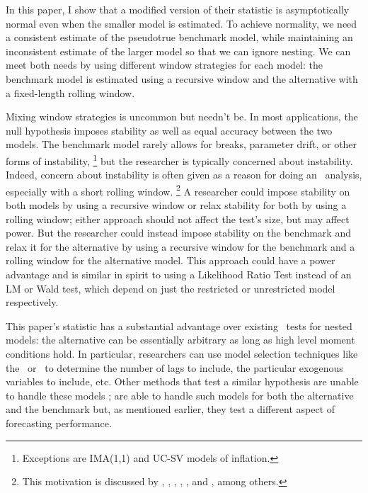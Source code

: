 \documentclass[12pt,fleqn]{article}
\begin{document}
In this paper, I show that a modified version of their statistic is
asymptotically normal even when the smaller model is estimated.  To
achieve normality, we need a consistent estimate of the pseudotrue
benchmark model, while maintaining an inconsistent estimate of the
larger model so that we can ignore nesting.  We can meet both needs by
using different window strategies for each model: the benchmark model
is estimated using a recursive window and the alternative with a
fixed-length rolling window.

Mixing window strategies is uncommon but needn't be. In most
applications, the null hypothesis imposes stability as well as equal
accuracy between the two models.  The benchmark model rarely allows
for breaks, parameter drift, or other forms of
instability,%
\footnote{Exceptions are 
  IMA(1,1) and UC-SV models of inflation.} %
but the
researcher is typically concerned about instability.  Indeed, concern
about instability is often given as a reason for doing an \oos\
analysis, especially with a short rolling window.%
\footnote{This
  motivation is discussed by \citet{StW:03}, \citet{PeT:05,PeT:07},
  \cite{GiW:06}, \citet{GoW:08}, \citet{ClM:09c}, and
  \cite{GiR:09,GiR:10}, among others.} %
A researcher could impose
stability on both models by using a recursive window or relax
stability for both by using a rolling window; either approach should
not affect the test's size, but may affect power.  But the researcher
could instead impose stability on the benchmark and relax it for the
alternative by using a recursive window for the benchmark and a
rolling window for the alternative model.  This approach could have a
power advantage and is similar in spirit to using a Likelihood Ratio
Test instead of an LM or Wald test, which depend on just the
restricted or unrestricted model respectively.

This paper's statistic has a substantial advantage over existing \oos\
tests for nested models: the alternative can be essentially arbitrary
as long as high level moment conditions hold.  In particular,
researchers can use model selection techniques like the \aic\ or \bic\
to determine the number of lags to include, the particular exogenous
variables to include, etc.  Other methods that test a similar
hypothesis are unable to handle these models \citep[except][which does
not allow the benchmark to be estimated]{ClW:06}; \citet{GiW:06} are
able to handle such models for both the alternative and the benchmark
but, as mentioned earlier, they test a different aspect of forecasting
performance.
\end{document}
